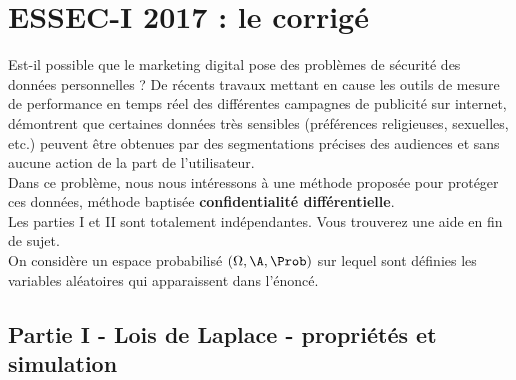 \chapter*{ESSEC-I 2017 : le corrigé}
  
%

\noindent
Est-il possible que le marketing digital pose des problèmes de
sécurité des données personnelles ? De récents travaux %
mettant en cause les outils de mesure de performance en temps réel des
différentes campagnes de publicité sur internet, démontrent que
certaines données très sensibles (préférences religieuses, sexuelles,
etc.) peuvent être obtenues par des segmentations précises des
audiences et sans aucune action de la part de l'utilisateur.\\[.2cm]
Dans ce problème, nous nous intéressons à une méthode proposée pour
protéger ces données, méthode baptisée {\bf confidentialité
  différentielle}.\\[.2cm]
Les parties I et II sont totalement indépendantes. Vous trouverez une
aide \Scilab{} en fin de sujet.\\[.2cm]
On considère un espace probabilisé $(\Omega, \A , \Prob)$ sur lequel
sont définies les variables aléatoires qui apparaissent dans l'énoncé.

\section*{Partie I - Lois de Laplace - propriétés et simulation}

